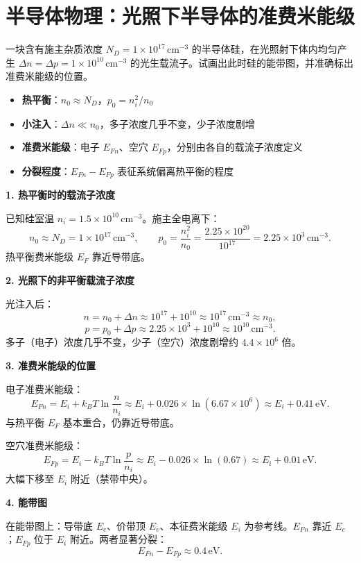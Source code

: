 \section{半导体物理：光照下半导体的准费米能级}
\label{sec:quasi-fermi-levels}

\begin{modelbox}[题目：光激发n型硅的准费米能级]
一块含有施主杂质浓度 $N_D=1\times10^{17}\,\text{cm}^{-3}$ 的半导体硅，在光照射下体内均匀产生 $\Delta n=\Delta p=1\times10^{10}\,\text{cm}^{-3}$ 的光生载流子。试画出此时硅的能带图，并准确标出准费米能级的位置。
\end{modelbox}

\begin{tipbox}[考点快速分析]
\begin{itemize}
    \item \textbf{热平衡}：$n_0\approx N_D$，$p_0=n_i^2/n_0$
    \item \textbf{小注入}：$\Delta n\ll n_0$，多子浓度几乎不变，少子浓度剧增
    \item \textbf{准费米能级}：电子 $E_{Fn}$、空穴 $E_{Fp}$，分别由各自的载流子浓度定义
    \item \textbf{分裂程度}：$E_{Fn}-E_{Fp}$ 表征系统偏离热平衡的程度
\end{itemize}
\end{tipbox}

\begin{derivationbox}[标准解题过程]
\textbf{1. 热平衡时的载流子浓度}

已知硅室温 $n_i=1.5\times10^{10}\,\text{cm}^{-3}$。施主全电离下：
\[
n_0\approx N_D=1\times10^{17}\,\text{cm}^{-3},\qquad p_0=\frac{n_i^2}{n_0}=\frac{2.25\times10^{20}}{10^{17}}=2.25\times10^3\,\text{cm}^{-3}.
\]
热平衡费米能级 $E_F$ 靠近导带底。

\textbf{2. 光照下的非平衡载流子浓度}

光注入后：
\[
n=n_0+\Delta n\approx10^{17}+10^{10}\approx10^{17}\,\text{cm}^{-3}\approx n_0,
\]
\[
p=p_0+\Delta p\approx2.25\times10^3+10^{10}\approx10^{10}\,\text{cm}^{-3}.
\]
多子（电子）浓度几乎不变，少子（空穴）浓度剧增约 $4.4\times10^6$ 倍。

\textbf{3. 准费米能级的位置}

电子准费米能级：
\[
E_{Fn}=E_i+k_BT\ln\frac{n}{n_i}\approx E_i+0.026\times\ln(6.67\times10^6)\approx E_i+0.41\,\text{eV}.
\]
与热平衡 $E_F$ 基本重合，仍靠近导带底。

空穴准费米能级：
\[
E_{Fp}=E_i-k_BT\ln\frac{p}{n_i}\approx E_i-0.026\times\ln(0.67)\approx E_i+0.01\,\text{eV}.
\]
大幅下移至 $E_i$ 附近（禁带中央）。

\textbf{4. 能带图}

在能带图上：导带底 $E_c$、价带顶 $E_v$、本征费米能级 $E_i$ 为参考线。$E_{Fn}$ 靠近 $E_c$；$E_{Fp}$ 位于 $E_i$ 附近。两者显著分裂：
\begin{equation}
\boxed{E_{Fn}-E_{Fp}\approx0.4\,\text{eV}.}
\end{equation}
\end{derivationbox}

